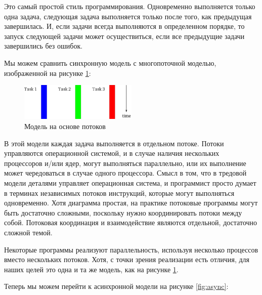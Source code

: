 Это самый простой стиль программирования. Одновременно выполняется только одна задача, 
следующая задача выполняется только после того, как предыдущая завершилась. И, если 
задачи всегда выполняются в определенном порядке, то запуск следующей задачи 
может осуществиться, если все предыдущие задачи завершились без ошибок.


Мы можем сравнить синхронную модель с многопоточной моделью, изображенной 
на рисунке \ref{fig:threaded}:

\begin{figure}[h]
\begin{center}
    \includegraphics[width=0.5\textwidth]{images/threaded.pdf}
\end{center}
    \caption{Модель на основе потоков\label{fig:threaded}}
\end{figure}

В этой модели каждая задача выполняется в
отдельном потоке. Потоки управляются операционной системой, и в
случае наличия нескольких процессоров и/или ядер, 
могут выполняться параллельно, или их выполнение
может чередоваться в случае одного процессора. Смысл в том, что
в тредовой модели деталями управляет операционная система, и 
программист просто думает в терминах независимых потоков инструкций,
которые могут выполняться одновременно. Хотя диаграмма простая, на
практике потоковые программы могут быть достаточно сложными,
поскольку нужно координировать потоки между собой. Потоковая координация и
взаимодействие являются отдельной, достаточно сложной темой.

Некоторые программы реализуют параллельность, используя несколько
процессов вместо нескольких потоков. Хотя, с точки зрения реализации есть
отличия, для наших целей это одна и та же модель, как на рисунке \ref{fig:threaded}.


Теперь мы можем перейти к асинхронной модели на рисунке \ref{fig:async}:

